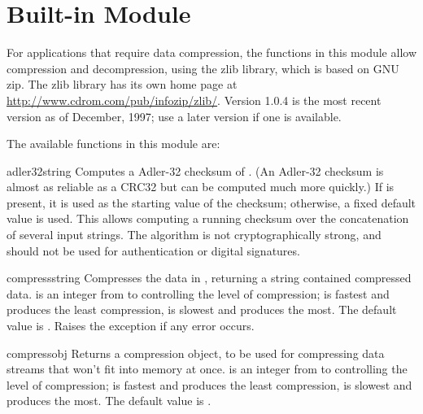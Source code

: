 
\section{Built-in Module }
\label{module-zlib}

For applications that require data compression, the functions in this
module allow compression and decompression, using the zlib library,
which is based on GNU zip.  The zlib library has its own home page at
\url{http://www.cdrom.com/pub/infozip/zlib/}.
Version 1.0.4 is the most recent version as of December, 1997; use a
later version if one is available.

The available functions in this module are:

\renewcommand{\indexsubitem}{(in module zlib)}
\begin{funcdesc}{adler32}{string}
   Computes a Adler-32 checksum of .  (An Adler-32
   checksum is almost as reliable as a CRC32 but can be computed much
   more quickly.)  If  is present, it is used as the
   starting value of the checksum; otherwise, a fixed default value is
   used.  This allows computing a running checksum over the
   concatenation of several input strings.  The algorithm is not
   cryptographically strong, and should not be used for
   authentication or digital signatures.
\end{funcdesc}

\begin{funcdesc}{compress}{string}
Compresses the data in , returning a string contained
compressed data.   is an integer from  to 
controlling the level of compression;  is fastest and produces
the least compression,  is slowest and produces the most.  The
default value is .  Raises the 
exception if any error occurs.
\end{funcdesc}

\begin{funcdesc}{compressobj}{}
  Returns a compression object, to be used for compressing data streams
  that won't fit into memory at once.   is an integer from
   to  controlling the level of compression;  is
  fastest and produces the least compression,  is slowest and
  produces the most.  The default value is .
\end{funcdesc}

